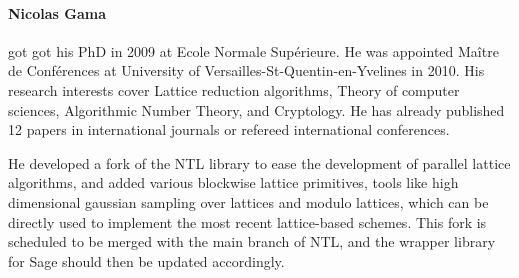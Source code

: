 \paragraph{Nicolas Gama} got got his PhD in 2009 at Ecole Normale
Supérieure. He
was appointed Maître de Conférences at University of
Versailles-St-Quentin-en-Yvelines in 2010.
His research interests cover Lattice reduction algorithms, Theory of
computer sciences, Algorithmic Number Theory, and Cryptology. He has
already published 12 papers in international journals or refereed
international conferences.

He developed a fork of the NTL library to ease the development of
parallel lattice
algorithms, and added various blockwise lattice primitives, tools like
high dimensional gaussian sampling over lattices and modulo lattices,
which can be directly used to implement the most recent lattice-based
schemes. This fork is scheduled to be merged with the main branch of
NTL, and the wrapper library for Sage should then be updated accordingly.
